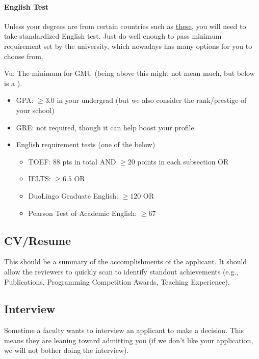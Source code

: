 \documentclass[11pt]{article}
\newenvironment{commentbox}{
 \small
    \begin{cbox}
 }{
   \end{cbox}
}
\newcommand{\red}[1]{{\color{red}{#1}}}
\begin{document}
\paragraph{English Test} Unless your degrees are from certain countries such as \href{https://github.com/dynaroars/dynaroars.github.io/wiki/About-GMU#standard-tests-waiver-eligible-countries}{these}, you will need to
take standardized English test. Just do well enough to pass minimum requirement set by the university, which nowadays has many options for you to choose from.

\begin{commentbox}
Vu: The minimum for GMU (being above this might not mean much, but below is a \red{red flag}).
\begin{itemize}
\item GPA: $\ge 3.0$ in your undergrad (but we also consider the rank/prestige of your school)
\item GRE: not required, though it can help boost your profile
\item English requirement tests (one of the below)
  \begin{itemize}    
  \item TOEF: 88 pts in total AND $\ge 20$ points in each subsection OR
  \item IELTS: $\ge 6.5$ OR
  \item DuoLingo Graduate English: $\ge 120$ OR 
  \item Pearson Test of Academic English: $\ge 67$
  \end{itemize}  
\end{itemize}
\end{commentbox}


\subsection{CV/Resume}
This should be a summary of the accomplishments of the applicant.  It should allow the reviewers to quickly scan to identify standout achievements (e.g., Publications, Programming Competition Awards, Teaching Experience).

\subsection{Interview}

Sometime a faculty wants to interview an applicant to make a decision. This means they are leaning toward admitting you (if we don't like your application, we will not bother doing the interview).
\end{document}
